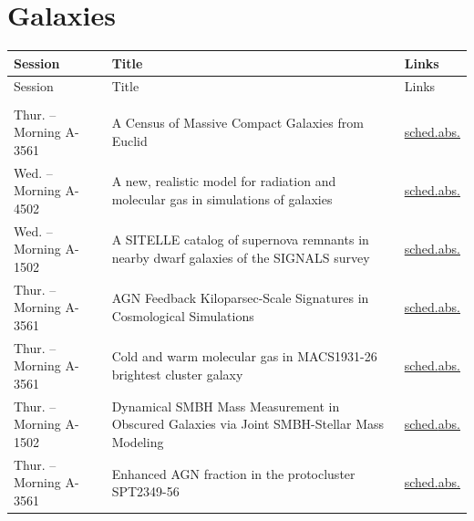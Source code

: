 \section*{Galaxies}
{\small
\setlength{\emergencystretch}{1em}
\begin{longtable}{@{}>{\TableRaggedRight\arraybackslash\hspace{0pt}}p{} >{\TableRaggedRight\arraybackslash\hspace{0pt}}p{} >{\TableRaggedRight\arraybackslash\hspace{0pt}}p{}@{}}
\toprule
Session & Title & Links \\
\midrule
\endfirsthead
\toprule
Session & Title & Links \\
\midrule
\endhead
\addlinespace[0.15em]
\multicolumn{3}{@{}l}{\sffamily\bfseries\color{cascateal} Talks} \\
\addlinespace[0.1em]
Thur. -- Morning A-3561 & A Census of Massive Compact Galaxies from Euclid & \hyperlink{schedule-talk-329}{sched.}\newline \hyperlink{abstract-talk-329}{abs.} \\
Wed. -- Morning A-4502 & A new, realistic model for radiation and molecular gas in simulations of galaxies & \hyperlink{schedule-talk-187}{sched.}\newline \hyperlink{abstract-talk-187}{abs.} \\
Wed. -- Morning A-1502 & A SITELLE catalog of supernova remnants in nearby dwarf galaxies of the SIGNALS survey & \hyperlink{schedule-talk-101}{sched.}\newline \hyperlink{abstract-talk-101}{abs.} \\
Thur. -- Morning A-3561 & AGN Feedback Kiloparsec-Scale Signatures in Cosmological Simulations & \hyperlink{schedule-talk-18}{sched.}\newline \hyperlink{abstract-talk-18}{abs.} \\
Thur. -- Morning A-3561 & Cold and warm molecular gas in MACS1931-26 brightest cluster galaxy & \hyperlink{schedule-talk-145}{sched.}\newline \hyperlink{abstract-talk-145}{abs.} \\
Thur. -- Morning A-1502 & Dynamical SMBH Mass Measurement in Obscured Galaxies via Joint SMBH-Stellar Mass Modeling & \hyperlink{schedule-talk-330}{sched.}\newline \hyperlink{abstract-talk-330}{abs.} \\
Thur. -- Morning A-3561 & Enhanced AGN fraction in the protocluster SPT2349-56 & \hyperlink{schedule-talk-327}{sched.}\newline \hyperlink{abstract-talk-327}{abs.} \\

\end{longtable}}

